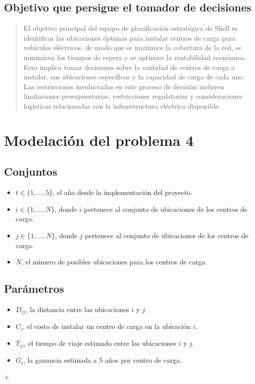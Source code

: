 \documentclass[letterpaper]{article}
\begin{document}
\begin{flushleft}
\subsection{Objetivo que persigue el tomador de decisiones}
\begin{quote}
    El objetivo principal del equipo de planificación estratégica de Shell es identificar las ubicaciones óptimas para instalar centros de carga para vehículos eléctricos, de modo que se maximice la cobertura de la red, se minimicen los tiempos de espera y se optimice la rentabilidad económica. Esto implica tomar decisiones sobre la cantidad de centros de carga a instalar, sus ubicaciones específicas y la capacidad de carga de cada uno. Las restricciones involucradas en este proceso de decisión incluyen limitaciones presupuestarias, restricciones regulatorias y consideraciones logísticas relacionadas con la infraestructura eléctrica disponible. 
\end{quote}

\section{Modelación del problema 4}
\subsection{Conjuntos}
\begin{itemize}
    \item $t \in \{1, \ldots, 5\}$, el año desde la implementación del proyecto.
    \item $i \in \{1, \ldots, N\}$, donde $i$ pertenece al conjunto de ubicaciones de los centros de carga.
    \item $j \in \{1, \ldots, N\}$, donde $j$ pertenece al conjunto de ubicaciones de los centros de carga.
    \item $N$, el número de posibles ubicaciones para los centros de carga.
\end{itemize}

\subsection{Parámetros}
\begin{itemize}
    \item $D_{ij}$, la distancia entre las ubicaciones $i$ y $j$.
    \item $C_i$, el costo de instalar un centro de carga en la ubicación $i$.
    \item $T_{ij}$, el tiempo de viaje estimado entre las ubicaciones $i$ y $j$.
    \item $G_i$, la ganancia estimada a 5 años por centro de carga.
\end{itemize}
+

\end{flushleft}
\end{document}
